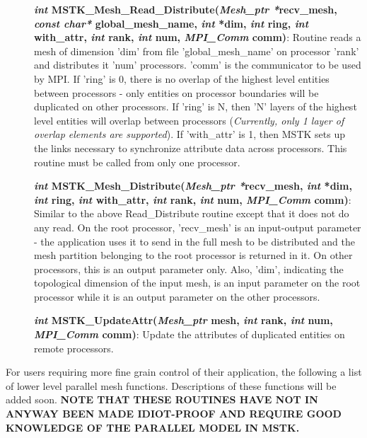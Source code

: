 \documentclass[12pt]{article}
\begin{document}
\begin{description}

\item[] {\bf {\em int} MSTK\_Mesh\_Read\_Distribute({\em Mesh\_ptr
      *}recv\_mesh, {\em const char*} global\_mesh\_name, {\em int} *dim,
    {\em int} ring, {\em int} with\_attr, {\em int} rank, {\em int}
    num, {\em MPI\_Comm} comm)}: Routine reads a mesh of dimension
  'dim' from file 'global\_mesh\_name' on processor 'rank' and
  distributes it 'num' processors. 'comm' is the communicator to be
  used by MPI. If 'ring' is 0, there is no overlap of the highest
  level entities between processors - only entities on processor
  boundaries will be duplicated on other processors. If 'ring' is N,
  then 'N' layers of the highest level entities will overlap between
  processors ({\em Currently, only 1 layer of overlap elements are
    supported}). If 'with\_attr' is 1, then MSTK sets up the links
  necessary to synchronize attribute data across processors. This routine must be called from only one processor.

\item[] {\bf {\em int} MSTK\_Mesh\_Distribute({\em Mesh\_ptr
      *}recv\_mesh, {\em int} *dim, {\em int} ring, {\em int}
    with\_attr, {\em int} rank, {\em int} num, {\em MPI\_Comm} comm)}:
  Similar to the above Read\_Distribute routine except that it does
  not do any read. On the root processor, 'recv\_mesh' is an
  input-output parameter - the application uses it to send in the full
  mesh to be distributed and the mesh partition belonging to the root
  processor is returned in it. On other processors, this is an output
  parameter only. Also, 'dim', indicating the topological dimension of
  the input mesh, is an input parameter on the root processor while it
  is an output parameter on the other processors.


\item[] {\bf {\em int} MSTK\_UpdateAttr({\em Mesh\_ptr} mesh, {\em
      int} rank, {\em int} num, {\em MPI\_Comm} comm)}: Update the
  attributes of duplicated entities on remote processors.

\end{description}

For users requiring more fine grain control of their application, the
following a list of lower level parallel mesh functions. Descriptions
of these functions will be added soon. {\bf NOTE THAT THESE ROUTINES
  HAVE NOT IN ANYWAY BEEN MADE IDIOT-PROOF AND REQUIRE GOOD KNOWLEDGE
  OF THE PARALLEL MODEL IN MSTK.}
\end{document}
